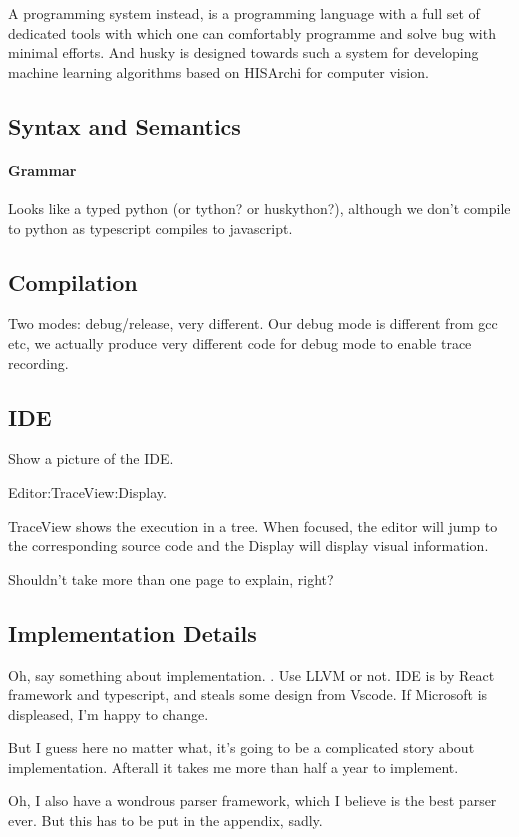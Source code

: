\documentclass[10pt, oneside]{article}   	%
\theoremstyle{definition}
\begin{document}
A programming system instead, is a programming language with a full set of dedicated tools with which one can comfortably programme and solve bug with minimal efforts. And husky is designed towards such a system for developing machine learning algorithms based on HISArchi for computer vision.
\subsection{Syntax and Semantics}

\paragraph{Grammar} Looks like a typed python (or tython? or huskython?), although we don't compile to python as typescript compiles to javascript.
\subsection{Compilation}


Two modes: debug/release, very different. Our debug mode is different from gcc etc, we actually produce very different code for debug mode to enable trace recording.
\subsection{IDE}

Show a picture of the IDE.

Editor:TraceView:Display.

TraceView shows the execution in a tree. When focused, the editor will jump to the corresponding source code and the Display will display visual information.

Shouldn't take more than one page to explain, right?

\subsection{Implementation Details}

Oh, say something about implementation. . Use LLVM or not. IDE is by React framework and typescript, and steals some design from Vscode. If Microsoft is displeased, I'm happy to change.

But I guess here no matter what, it's going to be a complicated story about implementation. Afterall it takes me more than half a year to implement.

Oh, I also have a wondrous parser framework, which I believe is the best parser ever. But this has to be put in the appendix, sadly.
\end{document}
